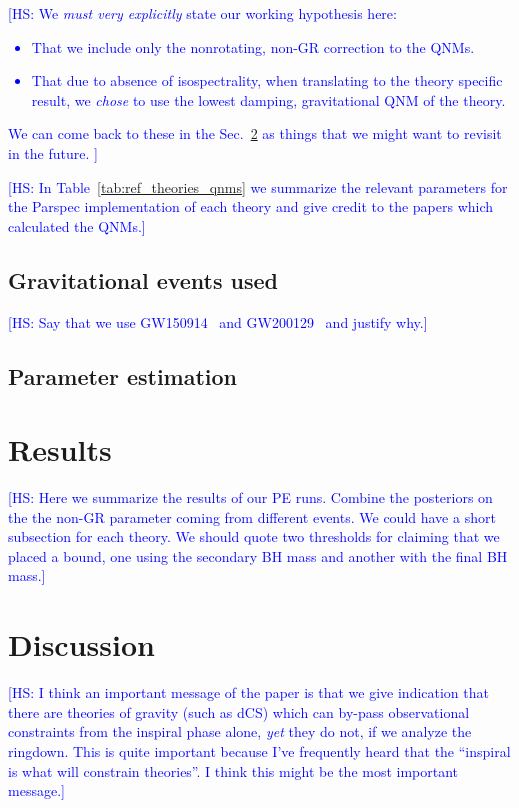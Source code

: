 \documentclass[twocolumn,prd,aps,superscriptaddress,preprintnumbers,tightenlines,showpacs,nofootinbib,eqsecnum,amsfonts,amsmath,longbibliography]{revtex4-2}
\newcommand{\hs}[1]{{\textcolor{blue}{{[HS: #1]}} }}
\begin{document}
\hs{We {\it must very explicitly} state our working hypothesis here:
%
\begin{itemize}
    \item That we include only the nonrotating, non-GR correction to the QNMs.
    \item That due to absence of isospectrality, when translating to the theory specific result,
    we {\it chose} to use the lowest damping, gravitational QNM of the theory.
\end{itemize}
%
We can come back to these in the Sec.~\ref{sec:discussion} as things that we
might want to revisit in the future.
}

\hs{In Table~\ref{tab:ref_theories_qnms} we summarize the relevant parameters for
the {\sc Parspec} implementation of each theory and give credit to the papers
which calculated the QNMs.}

\subsection{Gravitational events used}

\hs{Say that we use GW150914~\cite{LIGOScientific:2016aoc} and GW200129~\cite{LIGOScientific:2021djp} and justify why.}

\subsection{Parameter estimation}

\section{Results}
\label{sec:results}

\hs{Here we summarize the results of our PE runs. Combine the posteriors on the
the non-GR parameter coming from different events. We could have a short
subsection for each theory. We should quote two thresholds for claiming
that we placed a bound, one using the secondary BH mass and another with
the final BH mass.}

\section{Discussion}
\label{sec:discussion}

\hs{I think an important message of the paper is that we give indication that
there are theories of gravity (such as dCS) which can by-pass observational
constraints from the inspiral phase alone, {\it yet} they do not, if we
analyze the ringdown. This is quite important because I've frequently heard
that the ``inspiral is what will constrain theories''. I think this might be
the most important message.}
\end{document}
